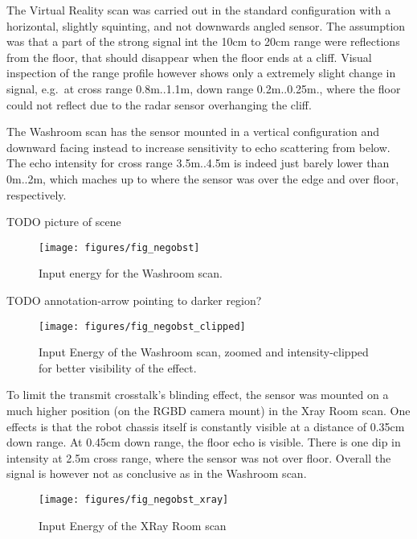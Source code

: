 The Virtual Reality scan was carried out in the standard configuration
with a horizontal, slightly squinting, and not downwards angled sensor.
The assumption was that a part of the strong signal int the 10cm to 20cm
range were reflections from the floor, that should disappear when the
floor ends at a cliff. Visual inspection of the range profile however
shows only a extremely slight change in signal, e.g.~at cross range
0.8m..1.1m, down range 0.2m..0.25m., where the floor could not reflect
due to the radar sensor overhanging the cliff.

The Washroom scan has the sensor mounted in a vertical configuration and
downward facing instead to increase sensitivity to echo scattering from
below. The echo intensity for cross range 3.5m..4.5m is indeed just
barely lower than 0m..2m, which maches up to where the sensor was over
the edge and over floor, respectively.

TODO picture of scene

\begin{figure}[htp]
    \centering
    \label{fig:negobst}
    \texttt{[image: figures/fig\_negobst]}
    \caption{Input energy for the Washroom scan.}
\end{figure}

TODO annotation-arrow pointing to darker region?

\begin{figure}[htp]
    \centering
    \label{fig:negobst_clipped}
    \texttt{[image: figures/fig\_negobst\_clipped]}
    \caption{Input Energy of the Washroom scan, zoomed and intensity-clipped for better visibility of the effect.}
\end{figure}

To limit the transmit crosstalk's blinding effect, the sensor was
mounted on a much higher position (on the RGBD camera mount) in the Xray
Room scan. One effects is that the robot chassis itself is constantly
visible at a distance of 0.35cm down range. At 0.45cm down range, the
floor echo is visible. There is one dip in intensity at 2.5m cross
range, where the sensor was not over floor. Overall the signal is
however not as conclusive as in the Washroom scan.

\begin{figure}[htp]
    \centering
    \label{fig:negobst_xray_clipped}
    \texttt{[image: figures/fig\_negobst\_xray]}
    \caption{Input Energy of the XRay Room scan}
\end{figure}

